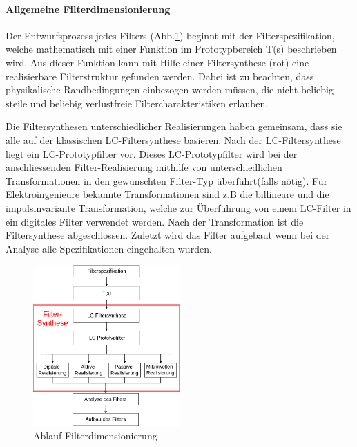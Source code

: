 \paragraph{Allgemeine Filterdimensionierung}

Der Entwurfsprozess jedes Filters (Abb.\ref{fig:Ablauf_Filterdimensionierung_Allgemein}) beginnt mit der Filterspezifikation, welche mathematisch mit einer Funktion im Prototypbereich T(s) beschrieben wird. Aus dieser Funktion kann mit Hilfe einer Filtersynthese (rot) eine realisierbare Filterstruktur gefunden werden. Dabei ist zu beachten, dass  physikalische Randbedingungen einbezogen werden müssen, die nicht beliebig steile und beliebig verlustfreie Filtercharakteristiken erlauben.

Die Filtersynthesen unterschiedlicher Realisierungen haben gemeinsam, dass sie alle auf der klassischen LC-Filtersynthese basieren. Nach der LC-Filtersynthese liegt ein LC-Prototypfilter vor. Dieses LC-Prototypfilter wird bei der anschliessenden Filter-Realisierung mithilfe von unterschiedlichen Transformationen in den gewünschten Filter-Typ überführt(falls nötig). Für Elektroingenieure bekannte Transformationen sind z.B die billineare und die impulsinvariante Transformation, welche zur Überführung von einem LC-Filter in ein digitales Filter verwendet werden. Nach der Transformation ist die Filtersynthese abgeschlossen. Zuletzt wird das Filter aufgebaut wenn bei der Analyse alle Spezifikationen eingehalten wurden.

\begin{figure}[h!]
\centering
 	\includegraphics[width=0.5\textwidth]{Ablauf_Filterdimensionierung_Allgemein.png}
 	\caption{Ablauf Filterdimensionierung}
 	\label{fig:Ablauf_Filterdimensionierung_Allgemein}
\end{figure}


